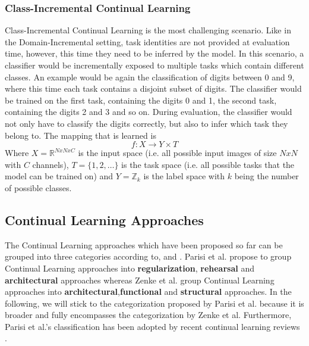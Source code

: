 \subsubsection{Class-Incremental Continual Learning}
\label{sec:ClassIncrementalContinualLearning}
Class-Incremental Continual Learning is the most challenging scenario. Like in the Domain-Incremental setting, task identities are not provided at evaluation time, however, this time they
need to be inferred by the model. In this scenario, a classifier would be incrementally exposed to multiple tasks which contain different classes. An example would be again the classification
of digits between 0 and 9, where this time each task contains a disjoint subset of digits. The classifier would be trained on the first task, containing the digits 0 and 1, the second task,
containing the digits 2 and 3 and so on. During evaluation, the classifier would not only have to classify the digits correctly, but also to infer which task they belong to. The mapping that
is learned is 
\begin{equation}
    f: X \rightarrow Y \times T
\end{equation}
Where $X = \mathbb{R}^{N x N x C}$ is the input space (i.e. all possible input images of size $N x N$ with $C$ channels), $T = \{1,2,\ldots\}$ is the task space (i.e. all possible
tasks that the model can be trained on) and $Y = \mathbb{Z}_{k}$ is the label space with $k$ being the number of possible classes.

\subsection{Continual Learning Approaches}
\label{sec:ContinualLearningApproaches}
The Continual Learning approaches which have been proposed so far can be grouped into three categories according to, \cite{parisi2019continual} \cite{mundt2020wholistic} and \cite{zenke2017continual}.
Parisi et al. \cite{parisi2019continual} propose to group Continual Learning approaches into \textbf{regularization}, \textbf{rehearsal} and \textbf{architectural} approaches whereas Zenke et al.
\cite{zenke2017continual} group Continual Learning approaches into \textbf{architectural},\textbf{functional} and \textbf{structural} approaches. In the following, we will stick to the
categorization proposed by Parisi et al. because it is broader and fully encompasses the categorization by Zenke et al. Furthermore, Parisi et al.'s classification has been adopted by
recent continual learning reviews \cite{mundt2020wholistic}.

